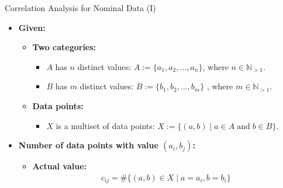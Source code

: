 \begin{frame}{Correlation Analysis for Nominal Data (I)}
	\begin{itemize}
		\item \textbf{Given:}
		\begin{itemize}
			\item \textbf{Two categories:}
			\begin{itemize}
				\item $A$ has $n$ distinct values: $A := \{a_1, a_2, \ldots, 
				a_n\}$, where $n \in \mathbb{N}_{>1}$.
				\item $B$ has $m$ distinct values: $B := \{b_1, b_2, \ldots, 
				b_m\}$ 
				, where $m \in \mathbb{N}_{>1}$.
			\end{itemize}
			\item \textbf{Data points:}
			\begin{itemize}
				\item $X$ is a multiset of data points: $X := \{(a, b) 
				\; \vert \; a \in A \; \text{and} \; b \in B\}$.
			\end{itemize}
		\end{itemize}
		\item \textbf{Number of data points with value $(a_i,b_j)$:}
		\begin{itemize}
			\item \textbf{Actual value:}
			\begin{align}
				c_{ij} = \#\{(a,b) \in X \mid a = a_i, b= b_i\}
			\end{align} 
		\end{itemize}
	\end{itemize}
\end{frame}

